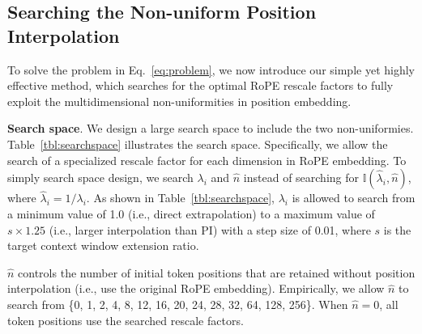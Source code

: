 \documentclass{article}
\theoremstyle{plain}
\theoremstyle{definition}
\theoremstyle{remark}
\begin{document}
\vspace{-2ex}
\subsection{Searching the Non-uniform Position Interpolation}
\vspace{-1ex}
To solve the problem in Eq.~\ref{eq:problem}, we now introduce our simple yet highly effective method, which searches for the optimal RoPE rescale factors to fully exploit the multidimensional non-uniformities in position embedding. 






\begin{table}[t]
	\caption{Search space for RoPE rescale factors. Tuples of three values represent the lowest value, highest, and step size.}
	\label{tbl:searchspace}
	\small
	\centering 
	\end{table}
	
\noindent\textbf{Search space}. We  design a large search space to include the two non-uniformies.  Table~\ref{tbl:searchspace} illustrates the search space.  Specifically, we allow the search of a specialized rescale factor for each dimension in RoPE embedding. 
 To simply search space design, we search $\lambda_i$ and $\hat{n}$ instead of searching for $\mathbb{I}(\hat{\lambda}_{i},\hat{n})$, where  $\hat{\lambda}_{i}=1/\lambda_i$. 
 As shown in Table~\ref{tbl:searchspace}, $\lambda_i$ is allowed to search from a minimum value of 1.0 (i.e., direct extrapolation) to a maximum value of $s\times1.25$ (i.e., larger interpolation than PI) with a step size of 0.01, where $s$ is the target context window extension ratio.

$\hat{n}$ controls the number of initial token positions that are retained without position interpolation (i.e., use the original RoPE embedding). Empirically, we 
 allow $\hat{n}$ to search from \{0, 1, 2, 4, 8, 12, 16, 20, 24, 28, 32, 64, 128, 256\}. When $\hat{n}=0$, all token positions use the searched rescale factors.
\end{document}
